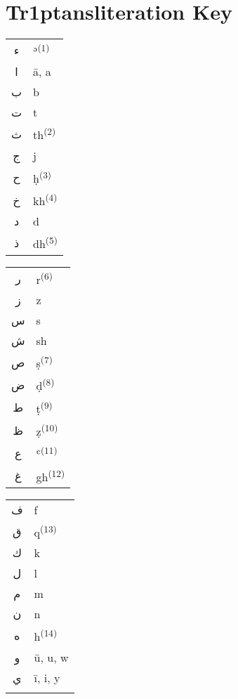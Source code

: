 \documentclass[oneside,ebook]{memoir}
\begin{document}
\chapter*{Tr\kern 1ptansliteration Key}
\vspace{-2.3em}
\thispagestyle{empty}

\begin{table}[!h]
{\def\arraystretch{1.2}\tabcolsep=5pt
\begin{tabular}{@{}cl@{}}
\textarabic{ء} & {\large ʾ}\textsuperscript{(1)}\\
\textarabic{ا} & {\large ā, a}\\
\textarabic{ب} & {\large b}\\
\textarabic{ت} & {\large t}\\
\textarabic{ث} & {\large th}\textsuperscript{(2)}\\
\textarabic{ج} & {\large j}\\
\textarabic{ح} & {\large ḥ}\textsuperscript{(3)}\\
\textarabic{خ} & {\large kh}\textsuperscript{(4)}\\
\textarabic{د} & {\large d}\\
\textarabic{ذ} & {\large dh}\textsuperscript{(5)}\\
\end{tabular}}
\hfill
{\def\arraystretch{1.2}\tabcolsep=5pt
	\begin{tabular}{@{}cl@{}}
\textarabic{ر} & {\large r}\textsuperscript{(6)}\\
\textarabic{ز} & {\large z}\\
\textarabic{س} & {\large s}\\
\textarabic{ش} & {\large sh}\\
\textarabic{ص} & {\large ṣ}\textsuperscript{(7)}\\
\textarabic{ض} & {\large ḍ}\textsuperscript{(8)}\\
\textarabic{ط} & {\large ṭ}\textsuperscript{(9)}\\
\textarabic{ظ} & {\large ẓ}\textsuperscript{(10)}\\
\textarabic{ع} & {\large ʿ}\textsuperscript{(11)}\\
\textarabic{غ} & {\large gh}\textsuperscript{(12)}\\
\end{tabular}}
\hfill
{\def\arraystretch{1.2}\tabcolsep=5pt
\begin{tabular}{@{}cl@{}}
\textarabic{ف} & {\large f}\\
\textarabic{ق} & {\large q}\textsuperscript{(13)}\\
\textarabic{ك} & {\large k}\\
\textarabic{ل} & {\large l}\\
\textarabic{م} & {\large m}\\
\textarabic{ن} & {\large n}\\
\textarabic{ه} & {\large h}\textsuperscript{(14)}\\
\textarabic{و} & {\large ū, u, w}\\
\textarabic{ي} & {\large ī, i, y}\\
\textarabic{} & {\large }\\
\end{tabular}}
\end{table}
\end{document}
